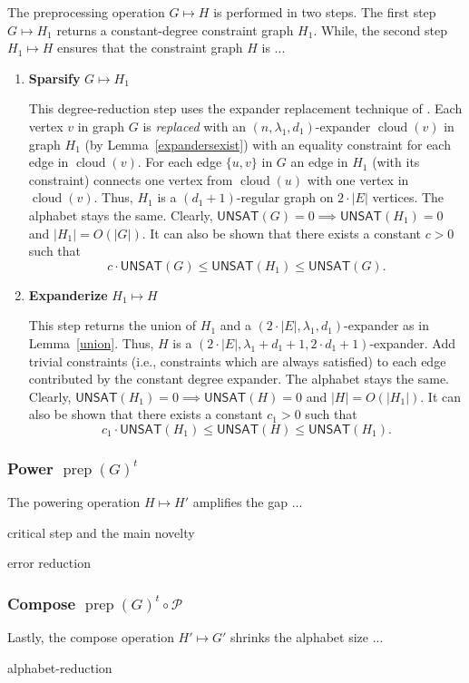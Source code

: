 \documentclass{article}
\newcommand{\UNSAT}{\mathsf{UNSAT}}
\newcommand{\prep}{{\operatorname{prep}}}
\newcommand{\cloud}{{\operatorname{cloud}}}
\begin{document}
The preprocessing operation $G \mapsto H$ is performed in two steps.
The first step $G \mapsto H_1$ returns a constant-degree constraint graph $H_1$.
While, the second step $H_1 \mapsto H$ ensures that the constraint graph $H$
is ... 

\begin{enumerate}
\item \textbf{Sparsify} $G \mapsto H_1$

This degree-reduction step uses the expander replacement technique of
\cite{papadimitriou1991optimization}.
Each vertex $v$ in graph $G$ is \emph{replaced} with an $(n, \lambda_1, d_1)$-expander
$\cloud(v)$ in graph $H_1$ (by Lemma~\ref{expandersexist})
with an equality constraint for each edge in $\cloud(v)$.
For each edge $\{u,v\}$ in $G$ an edge in $H_1$ (with its constraint)
connects one vertex from $\cloud(u)$ with one vertex in $\cloud(v)$.
Thus, $H_1$ is a $(d_1+1)$-regular graph on $2\cdot|E|$ vertices.
The alphabet stays the same.
Clearly, $\UNSAT(G)=0 \implies \UNSAT(H_1)=0$ and $|H_1|=O(|G|)$.
It can also be shown that there exists a constant $c>0$ such that
$$
c\cdot\UNSAT(G) \le \UNSAT(H_1) \le \UNSAT(G). 
$$

\item \textbf{Expanderize} $H_1 \mapsto H$

This step returns the union of $H_1$ and a $(2\cdot|E|, \lambda_1, d_1)$-expander
as in Lemma~\ref{union}.
Thus, $H$ is a $(2\cdot|E|, \lambda_1 + d_1 + 1, 2\cdot d_1 + 1)$-expander.
Add trivial constraints (i.e., constraints which are always satisfied)
to each edge contributed by the constant degree expander.
The alphabet stays the same.
Clearly, $\UNSAT(H_1)=0 \implies \UNSAT(H)=0$
and $|H|=O(|H_1|)$.
It can also be shown that there exists a constant $c_1>0$ such that
$$
c_1\cdot\UNSAT(H_1) \le \UNSAT(H) \le \UNSAT(H_1). 
$$

\end{enumerate}

\subsubsection*{Power $\prep(G)^t$}

The powering operation $H \mapsto H'$ amplifies the gap ...

critical step and the main novelty

error reduction

\subsubsection*{Compose $\prep(G)^t \circ \mathcal{P}$}

Lastly, the compose operation $H' \mapsto G'$ shrinks the alphabet size ...

alphabet-reduction

\newpage



\end{document}
